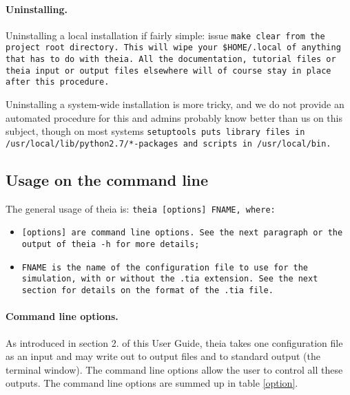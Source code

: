 \documentclass{article}
\begin{document}
\paragraph{Uninstalling.} Uninstalling a local installation if fairly simple: issue \tt{make clear} from the project root directory. This will wipe your \tt{\$HOME/.local} of anything that has to do with theia. All the documentation, tutorial files or theia input or output files elsewhere will of course stay in place after this procedure.

Uninstalling a system-wide installation is more tricky, and we do not provide an automated procedure for this and admins probably know better than us on this subject, though on most systems \tt{setuptools} puts library files in \tt{/usr/local/lib/python2.7/*-packages} and scripts in \tt{/usr/local/bin}.

\subsection{Usage on the command line}
The general usage of theia is: \tt{theia [options] FNAME}, where:

\begin{itemize}
\item \tt{[options]} are command line options. See the next paragraph or the output of \tt{theia -h} for more details;
\item \tt{FNAME} is the name of the configuration file to use for the simulation, with or without the \tt{.tia} extension. See the next section for details on the format of the \tt{.tia} file.
\end{itemize}

\paragraph{Command line options.}As introduced in section 2. of this User Guide, theia takes one configuration file as an input and may write out to output files and to standard output (the terminal window). The command line options allow the user to control all these outputs. The command line options are summed up in table \ref{option}.
\end{document}
